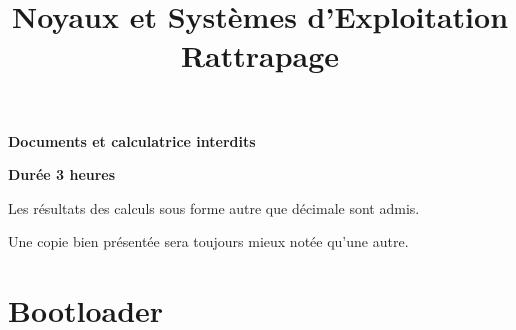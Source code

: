 %
%
%
%
%

%
%

%
%

\def\path{../../..}

%
%



%
%
\date{}
\title{Noyaux et Syst\`emes d'Exploitation \\ Rattrapage}

%
%

\rhead{}

%
%
\usepackage[utf8]{inputenc}
\usepackage{enumitem}


%
%

\maketitle

%
%

\indentation{}

%
%

\begin{center}

\textbf{Documents et calculatrice interdits}

\textbf{Durée 3 heures}

\scriptsize{Les résultats des calculs sous forme autre que décimale sont admis.}

\scriptsize{Une copie bien présentée sera toujours mieux notée qu'une autre.}

\end{center}

%
%

%
%

\section{{Bootloader}
         {\hfill{} }}


